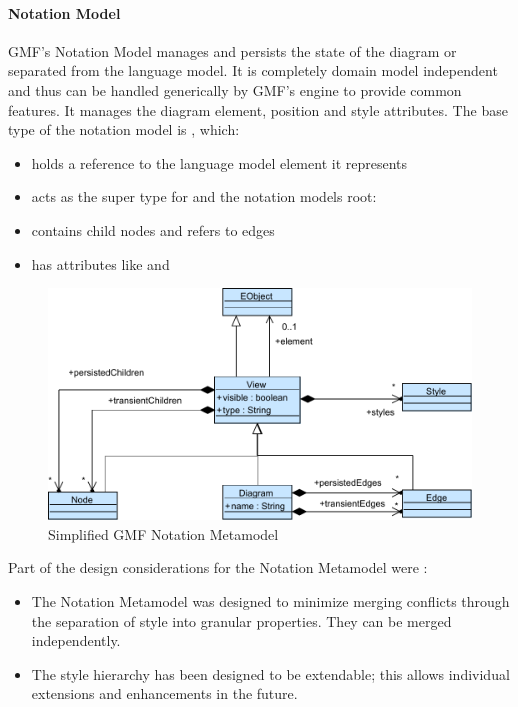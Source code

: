 \paragraph{Notation Model}
GMF's Notation Model manages and persists the state of the diagram or  separated from the language model. It is completely domain model independent and thus can be handled generically by GMF's engine to provide common features. It manages the diagram element, position and style attributes. \cite{EMP} The base type of the notation model is , which:
\begin{itemize}
	\item holds a reference to the language model element it represents 
	\item acts as the super type for  and the notation models root: 
	\item contains child nodes and refers to edges
	\item has attributes like  and 
\end{itemize}

\begin{figure}
\centering
\includegraphics[scale=0.8]{gfx/ex/GMF_Notation} 
\caption{Simplified GMF Notation Metamodel}
\label{MM:GMF}
\end{figure}

Part of the design considerations for the Notation Metamodel were \cite{GMFDoc}:
\begin{itemize}
	\item The Notation Metamodel was designed to minimize merging conflicts through the separation of style into granular properties. They can be merged independently.
	\item The style hierarchy has been designed to be extendable; this allows individual extensions and enhancements in the future. 
\end{itemize}

